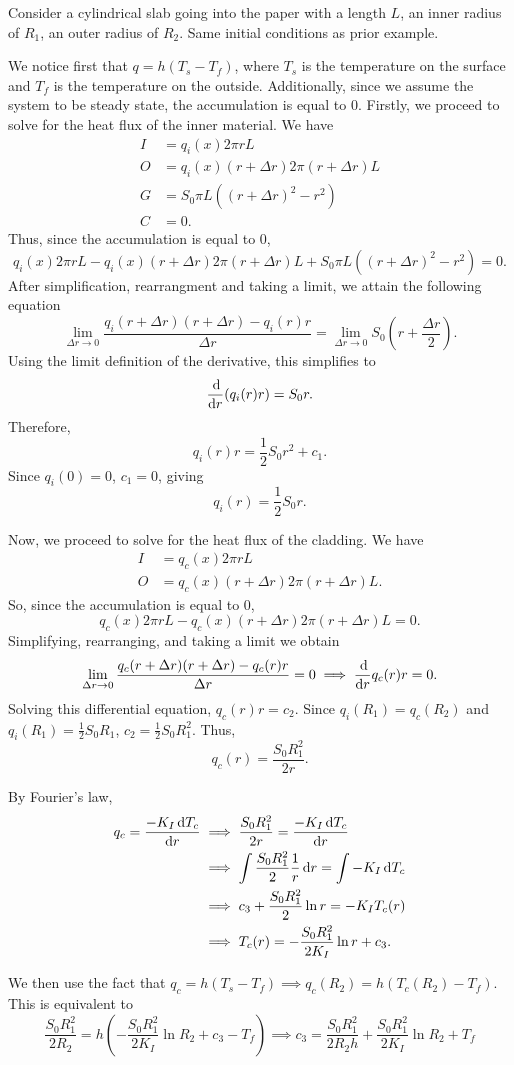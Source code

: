 \begin{example}
    Consider a cylindrical slab going into the paper with a length $L$, an
    inner radius of $R_1$, an outer radius of $R_2$. Same initial conditions
    as prior example.
\end{example}
We notice first that $q = h(T_s-T_f)$, where $T_s$ is the temperature on the
surface and $T_f$ is the temperature on the outside. Additionally, since
we assume the system to be steady state, the accumulation is equal to $0$. Firstly,
we proceed to solve for the heat flux of the inner material. We have
\begin{align*}
    I &= q_i(x)2\pi r L \\
    O &= q_i(x)(r+\Delta r)2 \pi (r+\Delta r)L \\
    G &= S_0\pi L ((r+ \Delta r)^2-r^2) \\
    C &= 0.
\end{align*}
Thus, since the accumulation is equal to $0$,
$$q_i(x)2\pi r L  -  q_i(x)(r+\Delta r)2 \pi (r+\Delta r)L + S_0\pi L ((r+ \Delta r)^2-r^2) = 0.$$
After simplification, rearrangment  and taking a limit, we attain the following equation
$$\lim_{\Delta r \rightarrow 0} \frac{q_i(r+\Delta r)(r+\Delta r)-q_i(r)r}{\Delta r}
= \lim_{\Delta r \rightarrow 0} S_0 \left(r+\frac{\Delta r}{2}\right).$$
Using the limit definition of the derivative, this simplifies to
$$\frac{\dif}{\dif r} (q_i(r)r) = S_0 r.$$ Therefore,
$$q_i(r)r = \frac{1}{2}S_0 r^2 + c_1.$$ Since $q_i(0) = 0$, $c_1 = 0$, giving
$$q_i(r) = \frac{1}{2}S_0 r.$$

Now, we proceed to solve for the heat flux of the cladding. We have
\begin{align*}
    I &= q_c(x)2 \pi r L \\
    O &= q_c(x)(r+\Delta r)2 \pi (r+\Delta r) L.
\end{align*}
So, since the accumulation is equal to $0$, $$q_c(x)2 \pi r L - q_c(x)(r+\Delta r)2 \pi (r+\Delta r) L = 0.$$
Simplifying, rearranging, and taking a limit we obtain
\begin{align*}
    \lim_{\Delta r \rightarrow 0} \frac{q_c(r+\Delta r)(r+\Delta r)-q_c(r)r}{\Delta r} = 0
    \implies \frac{\dif}{\dif r} q_c(r)r = 0.
\end{align*}
Solving this differential equation, $q_c(r)r = c_2$. Since $q_i(R_1) = q_c(R_2)$
and $q_i(R_1) = \frac{1}{2}S_0 R_1$, $c_2 = \frac{1}{2}S_0 R_1^2$. Thus,
$$q_c(r) = \frac{S_0R_1^2}{2r}.$$

By Fourier's law, 
\begin{align*}
    q_c = \frac{-K_I \dif T_c}{\dif r} &\implies \frac{S_0R_1^2}{2r} = \frac{-K_I \dif T_c}{\dif r} \\
                                       &\implies \int \frac{S_0R_1^2}{2}\frac{1}{r} \dif r = \int -K_I \dif T_c \\
                                       &\implies c_3 + \frac{S_0R_1^2}{2}\ln r = -K_I T_c(r) \\
                                       &\implies T_c(r) = -\frac{S_0R_1^2}{2K_I}\ln r + c_3.
\end{align*}

We then use the fact that $q_c = h(T_s-T_f) \implies q_c(R_2) = h(T_c(R_2)-T_f)$.
This is equivalent to
$$\frac{S_0R_1^2}{2R_2} = h\left( -\frac{S_0R_1^2}{2K_I} \ln R_2 +c_3 - T_f\right)
\implies c_3 = \frac{S_0R_1^2}{2R_2h} +\frac{S_0R_1^2}{2K_I} \ln R_2 +T_f$$



